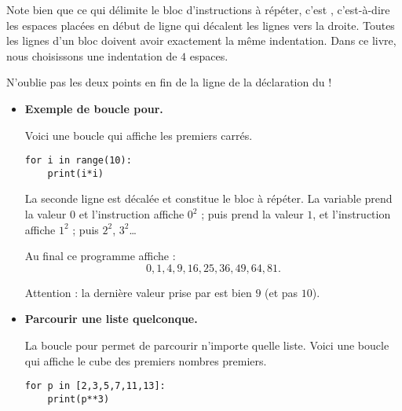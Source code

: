 \documentclass[11pt,class=report,crop=false]{standalone}
\begin{document}
\begin{cours}





Note bien que ce qui délimite le bloc d'instructions à répéter, c'est , c'est-à-dire les espaces placées en début de ligne qui décalent les lignes vers la droite.
Toutes les lignes d'un bloc doivent avoir exactement la même indentation. Dans ce livre, nous choisissons une indentation de $4$ espaces.

N'oublie pas les deux points en fin de la ligne de la déclaration du  !

\begin{itemize}
  \item \textbf{Exemple de boucle \og{}pour\fg{}.}

Voici une boucle qui affiche les premiers carrés. 
\begin{center}
\begin{minipage}{0.5\textwidth} 
\begin{lstlisting}
for i in range(10):
    print(i*i)
\end{lstlisting}
\end{minipage}
\end{center} 
La seconde ligne est décalée et constitue le bloc à répéter.
La variable  prend la valeur $0$ et l'instruction affiche $0^2$ ;
puis  prend la valeur $1$, et l'instruction affiche $1^2$ ; puis $2^2$, $3^2$\ldots

Au final ce programme affiche :
$$0,1,4,9,16,25,36,49,64,81.$$

Attention : la dernière valeur prise par  est bien $9$ (et pas $10$).

  \item \textbf{Parcourir une liste quelconque.}
  
La boucle \og{}pour\fg{} permet de parcourir n'importe quelle liste. Voici une boucle qui affiche le cube des premiers nombres premiers.
\begin{center}
\begin{minipage}{0.5\textwidth} 
\begin{lstlisting}
for p in [2,3,5,7,11,13]:
    print(p**3)
\end{lstlisting}
\end{minipage}
\end{center} 


\end{itemize}
\end{cours}
\end{document}
